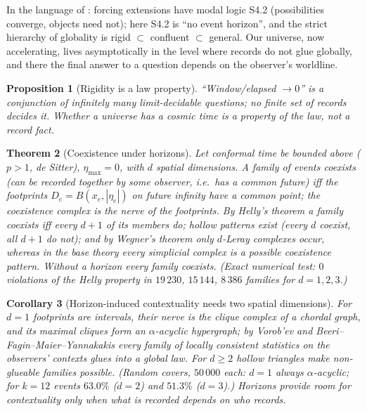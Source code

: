 \documentclass[11pt]{article}
\newtheorem{theorem}{Theorem}
\newtheorem{proposition}[theorem]{Proposition}
\newtheorem{corollary}[theorem]{Corollary}
\theoremstyle{definition}
\theoremstyle{remark}
\begin{document}
In the language of \cite{pzfc}: forcing extensions have modal logic S4.2 (possibilities converge, objects need not); here S4.2 is ``no event horizon'', and the strict hierarchy of globality is rigid $\subset$ confluent $\subset$ general. Our universe, now accelerating, lives asymptotically in the level where records do not glue globally, and there the final answer to a question depends on the observer's worldline.

\begin{proposition}[Rigidity is a law property]
``Window/elapsed $\to0$'' is a conjunction of infinitely many limit-decidable questions; no finite set of records decides it. Whether a universe has a cosmic time is a property of the law, not a record fact.
\end{proposition}

\begin{theorem}[Coexistence under horizons]\label{thm:nerve}
Let conformal time be bounded above ($p>1$, de Sitter), $\eta_{\max}=0$, with $d$ spatial dimensions. A family of events coexists (can be recorded together by some observer, i.e.\ has a common future) iff the footprints $D_e=B(x_e,|\eta_e|)$ on future infinity have a common point; the coexistence complex is the nerve of the footprints. By Helly's theorem \cite{helly} a family coexists iff every $d+1$ of its members do; hollow patterns exist (every $d$ coexist, all $d+1$ do not); and by Wegner's theorem \cite{wegner} only $d$-Leray complexes occur, whereas in the base theory every simplicial complex is a possible coexistence pattern. Without a horizon every family coexists. (Exact numerical test: $0$ violations of the Helly property in $19\,230$, $15\,144$, $8\,386$ families for $d=1,2,3$.)
\end{theorem}

\begin{corollary}[Horizon-induced contextuality needs two spatial dimensions]
For $d=1$ footprints are intervals, their nerve is the clique complex of a chordal graph, and its maximal cliques form an $\alpha$-acyclic hypergraph; by Vorob'ev \cite{vorobev} and Beeri--Fagin--Maier--Yannakakis \cite{bfmy} every family of locally consistent statistics on the observers' contexts glues into a global law. For $d\ge2$ hollow triangles make non-glueable families possible. (Random covers, $50\,000$ each: $d=1$ always $\alpha$-acyclic; for $k=12$ events $63.0\%$ ($d=2$) and $51.3\%$ ($d=3$).) Horizons provide room for contextuality only when what is recorded depends on who records.
\end{corollary}
\end{document}
